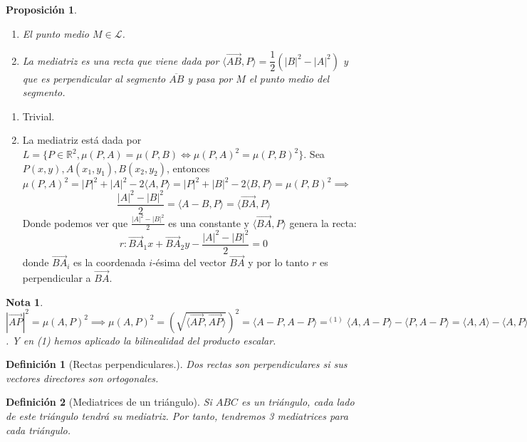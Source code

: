 \documentclass[11pt, a4paper]{article}
\makeatletter
\newif\IfInSansMode
\let\oldsf\sffamily
\renewcommand*{\sffamily}{\oldsf\mathversion{sans}\InSansModetrue}
\let\oldnorm\normalfont
\renewcommand*{\normalfont}{\oldnorm\InSansModefalse\mathversion{normal}}
\renewenvironment{proof}[1][\proofname] {\vspace{-15pt}\par\pushQED{\qed}\normalfont\topsep6\p@\@plus6\p@\relax\trivlist\item[\hskip\labelsep\it#1\@addpunct{.}]\ignorespaces}{\popQED\endtrivlist\@endpefalse}
\renewcommand{\vec}{\overrightarrow}
\renewenvironment{proof}[1][\proofname] {\par\pushQED{\qed}\normalfont\topsep6\p@\@plus6\p@\relax\trivlist\item[\hskip\labelsep\itshape\sffamily#1\@addpunct{.}]\ignorespaces}{\popQED\endtrivlist\@endpefalse}
\theoremstyle{theorem-style}
\newtheorem{nprop}{Proposición}[section]
\theoremstyle{definition-style}
\newtheorem{ndef}{Definición}[section]
\theoremstyle{remark-style}
\newtheorem*{nota}{Nota}
\theoremstyle{example-style}
\newenvironment{nlist}
{\begin{enumerate}
    \renewcommand\labelenumi{(\emph{\roman{enumi})}}}
  {\end{enumerate}}
\makeatother
\begin{document}
\begin{nprop}\hfill
  \begin{nlist}
    \item El punto medio $M \in \mathcal{L}$. 
    \item La mediatriz es una recta que viene dada por $\langle\vec{AB},P\rangle  = \dfrac{1}{2}(|B|^2-|A|^2)$ y que es perpendicular al segmento $\overline{AB}$ y pasa por $M$ el punto medio del segmento.
  \end{nlist}
\end{nprop}

\begin{proof}\hfill
  \begin{nlist}
    \item Trivial.
    \item La mediatriz está dada por $L = \{P\in\mathbb{R}^2, \mu(P,A) = \mu(P,B)\iff \mu(P,A)^2 = \mu(P,B)^2\}$. Sea $P(x,y),A(x_1,y_1),B(x_2,y_2)$, entonces $\mu(P,A)^2 = |P|^2+|A|^2-2\langle A,P\rangle  = |P|^2+|B|^2-2\langle B,P\rangle = \mu(P,B)^2 \implies$ $$ \frac{|A|^2-|B|^2}{2} =\langle A-B,P\rangle  = \langle\vec{BA},P\rangle $$
    Donde podemos ver que $\frac{|A|^2-|B|^2}{2}$ es una constante y $\langle\vec{BA},P\rangle $ genera la recta:
    \[
      r: \vec{BA}_1x+ \vec{BA}_2y - \frac{|A|^2-|B|^2}{2} = 0
    \]
    donde $\vec{BA}_i$ es la coordenada $i$-ésima del vector $\vec{BA}$ y por lo tanto $r$ es perpendicular a $\vec{BA}$.
  \end{nlist}
\end{proof}

\begin{nota}
  $|\vec{AP}|^2 = \mu(A,P)^2\implies \mu(A,P)^2 = 	\left(\sqrt{\langle \vec{AP},\vec{AP}\rangle }\right)^2 =  \langle A-P, A-P \rangle  =^{(1)} \langle A,A-P\rangle -\langle P,A-P\rangle  =  \langle A,A\rangle  - \langle A,P\rangle +\langle P,P\rangle - \langle P,A\rangle   = |A|^2+|P|^2-2 \langle P,A\rangle $. Y en (1) hemos aplicado la bilinealidad del producto escalar.
\end{nota}
\begin{ndef}[Rectas perpendiculares.]
  Dos rectas son perpendiculares si sus vectores directores son ortogonales.
\end{ndef}

\begin{ndef}[Mediatrices de un triángulo]
  Si $ABC$ es un triángulo, cada lado de este triángulo tendrá su mediatriz. Por tanto, tendremos 3 mediatrices para cada triángulo.
\end{ndef}
\end{document}
